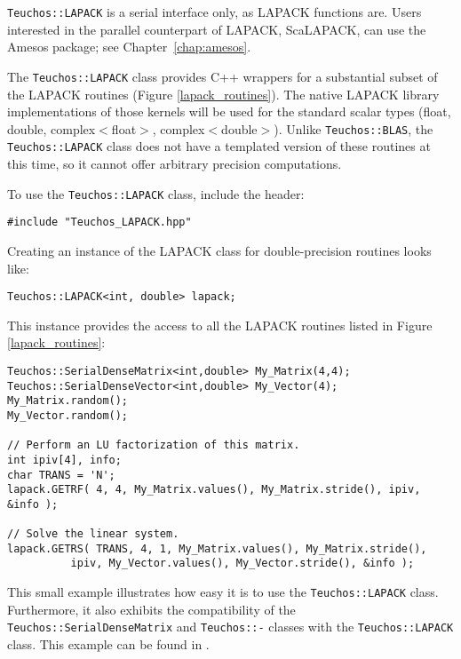 \verb!Teuchos::LAPACK! is a serial interface only, as LAPACK functions
are. Users interested in the parallel counterpart of LAPACK, ScaLAPACK,
can use the Amesos package; see Chapter~\ref{chap:amesos}.

The \verb!Teuchos::LAPACK! class provides C++ wrappers for a substantial subset of the 
LAPACK routines (Figure \ref{lapack_routines}).
The native LAPACK library implementations of those kernels
will be used for the standard scalar types (float, double, complex$<$float$>$, complex$<$double$>$).  
Unlike \verb!Teuchos::BLAS!, the \verb!Teuchos::LAPACK! class does not have a templated version of 
these routines at this time, so it cannot offer arbitrary precision computations.

To use the \verb!Teuchos::LAPACK! class, include the header:
{\small 
\begin{verbatim}
#include "Teuchos_LAPACK.hpp"
\end{verbatim}}
Creating an instance of the LAPACK class for double-precision routines looks like:
{\small 
\begin{verbatim}
Teuchos::LAPACK<int, double> lapack;
\end{verbatim}}
This instance provides the access to all the LAPACK routines listed in Figure \ref{lapack_routines}:
{\small
\begin{verbatim}
Teuchos::SerialDenseMatrix<int,double> My_Matrix(4,4);
Teuchos::SerialDenseVector<int,double> My_Vector(4);
My_Matrix.random();
My_Vector.random();

// Perform an LU factorization of this matrix. 
int ipiv[4], info;
char TRANS = 'N';
lapack.GETRF( 4, 4, My_Matrix.values(), My_Matrix.stride(), ipiv, &info ); 

// Solve the linear system.
lapack.GETRS( TRANS, 4, 1, My_Matrix.values(), My_Matrix.stride(), 
	      ipiv, My_Vector.values(), My_Vector.stride(), &info );
\end{verbatim}}

This small example illustrates how easy it is to use the {\tt Teuchos::LAPACK}
class.  Furthermore, it also exhibits the compatibility of the {\tt Teuchos::SerialDenseMatrix} 
and {\tt Teuchos::-} classes with the {\tt Teuchos::LAPACK} class.  
This example can be found in \newline {}.  


